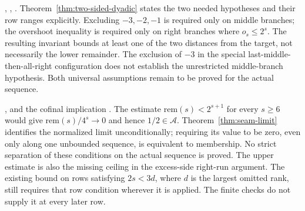 \begin{obs}
,
,
.
Theorem~\ref{thm:two-sided-dyadic} states the two needed hypotheses
and their row ranges explicitly.  Excluding $-3,-2,-1$ is required
only on middle branches; the overshoot inequality is required only
on right branches where $o_s\le2^s$.  The resulting invariant bounds
at least one of the two distances from the target, not necessarily
the lower remainder.  The exclusion of $-3$ in the special
last-middle-then-all-right configuration does not establish the
unrestricted middle-branch hypothesis.  Both universal assumptions
remain to be proved for the actual sequence.
\end{obs}

\begin{obs}
,
and the cofinal implication .
The estimate $\mathrm{rem}(s)<2^{s+1}$ for every $s\ge6$ would
give $\mathrm{rem}(s)/4^s\to0$ and hence $1/2\in\mathcal A$.
Theorem~\ref{thm:seam-limit} identifies the normalized limit
unconditionally; requiring its value to be zero, even only along
one unbounded sequence, is equivalent to membership.  No strict
separation of these conditions on the actual sequence is proved.
The upper estimate is also the missing ceiling in the excess-side
right-run argument.  The existing bound on rows satisfying $2s<3d$,
where $d$ is the largest omitted rank, still requires that row
condition wherever it is applied.  The finite checks do not supply
it at every later row.
\end{obs}

